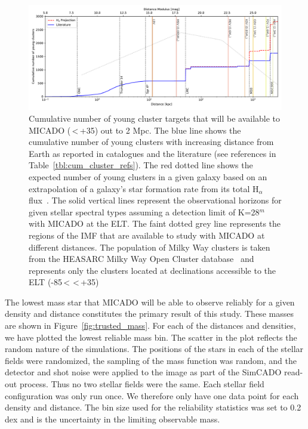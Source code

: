 \documentclass[referee]{aa}
\begin{document}
\begin{figure}

    \centering
    \includegraphics[width=\textwidth]{young_clusters_within_2Mpc_incl_MW.pdf}

    \caption{Cumulative number of young cluster targets that will be available to MICADO (\textdelta\,\textless\,+35\textdegree) out to 2 Mpc.
    The blue line shows the cumulative number of young clusters with increasing distance from Earth as reported in catalogues and the literature (see references in Table~\ref{tbl:cum_cluster_refs}).
    The red dotted line shows the expected number of young clusters in a given galaxy based on an extrapolation of a galaxy's star formation rate from its total H$_\alpha$ flux~\citep{caldwell09}.
    The solid vertical lines represent the observational horizons for given stellar spectral types assuming a detection limit of K=28$^m$ with MICADO at the ELT.
    The faint dotted grey line represents the regions of the IMF that are available to study with MICADO at different distances.
    The population of Milky Way clusters is taken from the HEASARC Milky Way Open Cluster database~\citep{heasarc_mwsc} and represents only the clusters located at declinations accessible to the ELT (-85\textdegree\,\textless\,\textdelta\,\textless\,+35\textdegree)
    }
    \label{fig:local_group_cluster_number}

\end{figure}


The lowest mass star that MICADO will be able to observe reliably for a given density and distance constitutes the primary result of this study.
These masses are shown in Figure~\ref{fig:trusted_mass}.
For each of the distances and densities, we have plotted the lowest reliable mass bin.
The scatter in the plot reflects the random nature of the simulations.
The positions of the stars in each of the stellar fields were randomized, the sampling of the mass function was random, and the detector and shot noise were applied to the image as part of the SimCADO read-out process.
Thus no two stellar fields were the same.
Each stellar field configuration was only run once.
We therefore only have one data point for each density and distance.
The bin size used for the reliability statistics was set to 0.2 dex and is the uncertainty in the limiting observable mass.
\end{document}
